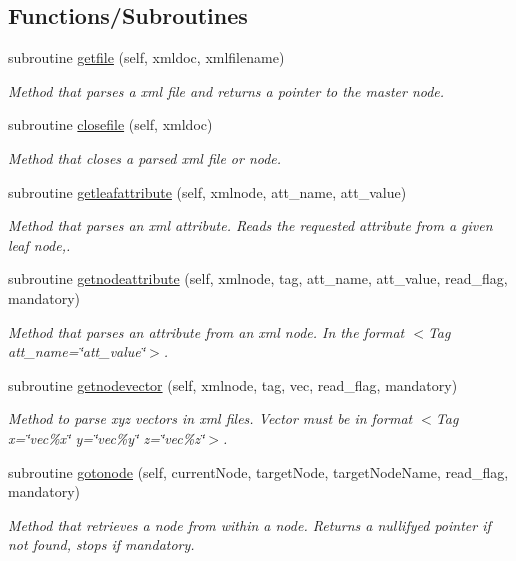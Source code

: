 \subsection*{Functions/\+Subroutines}
\begin{DoxyCompactItemize}
\item 
subroutine \mbox{\hyperlink{namespacexmlparser__mod_aa1f6c9620a625b407c80c9053492a21c}{getfile}} (self, xmldoc, xmlfilename)
\begin{DoxyCompactList}\small\item\em Method that parses a xml file and returns a pointer to the master node. \end{DoxyCompactList}\item 
subroutine \mbox{\hyperlink{namespacexmlparser__mod_a9eed98475e0d55a3c7b2eeb88925a48c}{closefile}} (self, xmldoc)
\begin{DoxyCompactList}\small\item\em Method that closes a parsed xml file or node. \end{DoxyCompactList}\item 
subroutine \mbox{\hyperlink{namespacexmlparser__mod_a3e977c7792b08b009a09cc1f7fb4f80a}{getleafattribute}} (self, xmlnode, att\+\_\+name, att\+\_\+value)
\begin{DoxyCompactList}\small\item\em Method that parses an xml attribute. Reads the requested attribute from a given leaf node,. \end{DoxyCompactList}\item 
subroutine \mbox{\hyperlink{namespacexmlparser__mod_ade14a3d90326f84cfa52844aa4a16b75}{getnodeattribute}} (self, xmlnode, tag, att\+\_\+name, att\+\_\+value, read\+\_\+flag, mandatory)
\begin{DoxyCompactList}\small\item\em Method that parses an attribute from an xml node. In the format \textquotesingle{}$<$\+Tag att\+\_\+name=\char`\"{}att\+\_\+value\char`\"{}$>$\textquotesingle{}. \end{DoxyCompactList}\item 
subroutine \mbox{\hyperlink{namespacexmlparser__mod_a0c2ac0513cee4e660e07cb083a790a53}{getnodevector}} (self, xmlnode, tag, vec, read\+\_\+flag, mandatory)
\begin{DoxyCompactList}\small\item\em Method to parse xyz vectors in xml files. Vector must be in format \textquotesingle{}$<$\+Tag x=\char`\"{}vec\%x\char`\"{} y=\char`\"{}vec\%y\char`\"{} z=\char`\"{}vec\%z\char`\"{}$>$\textquotesingle{}. \end{DoxyCompactList}\item 
subroutine \mbox{\hyperlink{namespacexmlparser__mod_acd860c3d06a25fc422edbcc3d356d976}{gotonode}} (self, current\+Node, target\+Node, target\+Node\+Name, read\+\_\+flag, mandatory)
\begin{DoxyCompactList}\small\item\em Method that retrieves a node from within a node. Returns a nullifyed pointer if not found, stops if mandatory. \end{DoxyCompactList}\end{DoxyCompactItemize}
